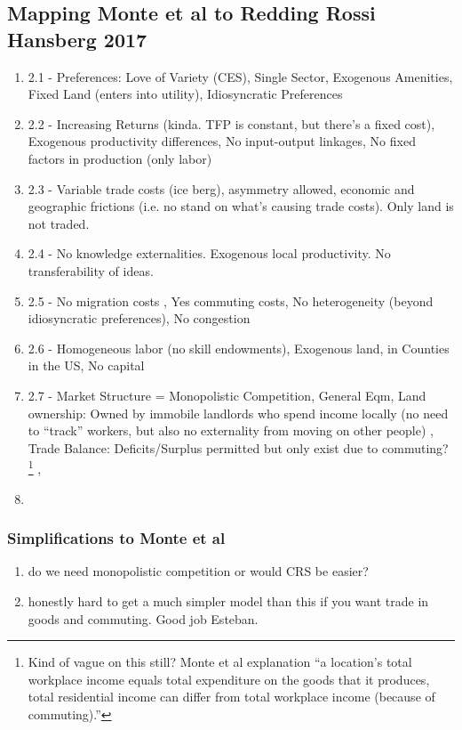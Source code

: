 \documentclass{article}
\begin{document}
\subsection{Mapping Monte et al to Redding Rossi Hansberg 2017}
\begin{enumerate}
\item 2.1 - Preferences: Love of Variety (CES), Single Sector, Exogenous Amenities, Fixed Land (enters into utility), Idiosyncratic Preferences
\item 2.2 - Increasing Returns (kinda. TFP is constant, but there's a fixed cost), Exogenous productivity differences, No input-output linkages, No fixed factors in production (only labor)
\item 2.3 - Variable trade costs (ice berg), asymmetry allowed, economic and geographic frictions (i.e. no stand on what's causing trade costs). Only land is not traded.
\item 2.4 - No knowledge externalities. Exogenous local productivity. No transferability of ideas. 
\item 2.5 - No migration costs , Yes commuting costs, No heterogeneity (beyond idiosyncratic preferences), No congestion
\item 2.6 - Homogeneous labor (no skill endowments), Exogenous land, in Counties in the US, No capital
\item 2.7 - Market Structure = Monopolistic Competition, General Eqm, Land ownership: Owned by immobile landlords who spend income locally (no need to ``track'' workers, but also no externality from moving on other people) , Trade Balance: Deficits/Surplus permitted but only exist due to commuting? \footnote{Kind of vague on this still? Monte et al explanation ``a location’s total workplace income equals total expenditure on the goods that it produces, total residential income can differ from total workplace income (because of commuting).''} , 
\item 
\end{enumerate}

\subsubsection{Simplifications to Monte et al}
\begin{enumerate}
\item do we need monopolistic competition or would CRS be easier? 
\item honestly hard to get a much simpler model than this if you want trade in goods and commuting. Good job Esteban.
\end{enumerate}
\end{document}
